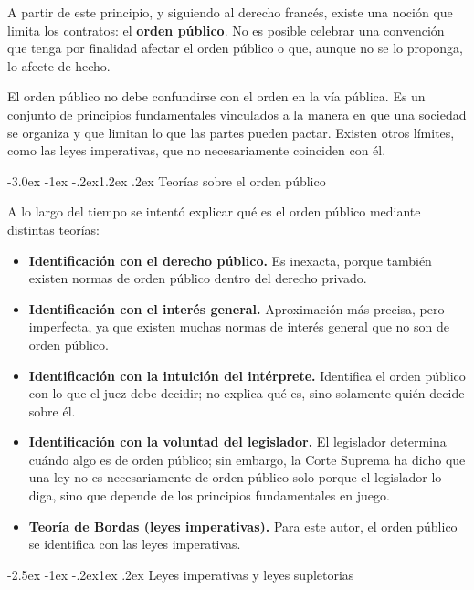 \documentclass[12pt,oneside]{book}
\makeatletter
\renewcommand\section{\@startsection{section}{1}{\z@}%
  {-3.0ex \@plus -1ex \@minus -.2ex}{1.2ex \@plus .2ex}%
  {\normalfont\large\bfseries\color{acento}}}
\renewcommand\subsection{\@startsection{subsection}{2}{\z@}%
  {-2.5ex \@plus -1ex \@minus -.2ex}{1ex \@plus .2ex}%
  {\normalfont\normalsize\bfseries}}
\makeatother
\begin{document}
A partir de este principio, y siguiendo al derecho francés, existe una noción que limita los contratos: el \textbf{orden público}. No es posible celebrar una convención que tenga por finalidad afectar el orden público o que, aunque no se lo proponga, lo afecte de hecho.

El orden público no debe confundirse con el orden en la vía pública. Es un conjunto de principios fundamentales vinculados a la manera en que una sociedad se organiza y que limitan lo que las partes pueden pactar. Existen otros límites, como las leyes imperativas, que no necesariamente coinciden con él.

\section{Teorías sobre el orden público}

A lo largo del tiempo se intentó explicar qué es el orden público mediante distintas teorías:

\begin{itemize}
\item \textbf{Identificación con el derecho público.} Es inexacta, porque también existen normas de orden público dentro del derecho privado.
\item \textbf{Identificación con el interés general.} Aproximación más precisa, pero imperfecta, ya que existen muchas normas de interés general que no son de orden público.
\item \textbf{Identificación con la intuición del intérprete.} Identifica el orden público con lo que el juez debe decidir; no explica qué es, sino solamente quién decide sobre él.
\item \textbf{Identificación con la voluntad del legislador.} El legislador determina cuándo algo es de orden público; sin embargo, la Corte Suprema ha dicho que una ley no es necesariamente de orden público solo porque el legislador lo diga, sino que depende de los principios fundamentales en juego.
\item \textbf{Teoría de Bordas (leyes imperativas).} Para este autor, el orden público se identifica con las leyes imperativas. %
\end{itemize}

\subsection{Leyes imperativas y leyes supletorias}
\end{document}
